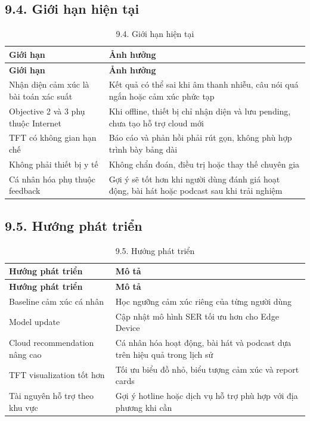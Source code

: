 \documentclass[12pt,a4paper]{article}
\begin{document}
\subsection*{9.4. Giới hạn hiện tại}

\begin{center}
\begin{longtable}{|P{0.30\textwidth}|P{0.62\textwidth}|}
\caption{9.4. Giới hạn hiện tại}\\
\hline
\textbf{Giới hạn} & \textbf{Ảnh hưởng} \\
\hline
\endfirsthead
\hline
\textbf{Giới hạn} & \textbf{Ảnh hưởng} \\
\hline
\endhead
Nhận diện cảm xúc là bài toán xác suất & Kết quả có thể sai khi âm thanh nhiễu, câu nói quá ngắn hoặc cảm xúc phức tạp \\
\hline
Objective 2 và 3 phụ thuộc Internet & Khi offline, thiết bị chỉ nhận diện và lưu pending, chưa tạo hỗ trợ cloud mới \\
\hline
TFT có không gian hạn chế & Báo cáo và phản hồi phải rút gọn, không phù hợp trình bày bảng dài \\
\hline
Không phải thiết bị y tế & Không chẩn đoán, điều trị hoặc thay thế chuyên gia \\
\hline
Cá nhân hóa phụ thuộc feedback & Gợi ý sẽ tốt hơn khi người dùng đánh giá hoạt động, bài hát hoặc podcast sau khi trải nghiệm \\
\hline
\end{longtable}
\end{center}

\subsection*{9.5. Hướng phát triển}

\begin{center}
\begin{longtable}{|P{0.30\textwidth}|P{0.62\textwidth}|}
\caption{9.5. Hướng phát triển}\\
\hline
\textbf{Hướng phát triển} & \textbf{Mô tả} \\
\hline
\endfirsthead
\hline
\textbf{Hướng phát triển} & \textbf{Mô tả} \\
\hline
\endhead
Baseline cảm xúc cá nhân & Học ngưỡng cảm xúc riêng của từng người dùng \\
\hline
Model update & Cập nhật mô hình SER tối ưu hơn cho Edge Device \\
\hline
Cloud recommendation nâng cao & Cá nhân hóa hoạt động, bài hát và podcast dựa trên hiệu quả trong lịch sử \\
\hline
TFT visualization tốt hơn & Tối ưu biểu đồ nhỏ, biểu tượng cảm xúc và report cards \\
\hline
Tài nguyên hỗ trợ theo khu vực & Gợi ý hotline hoặc dịch vụ hỗ trợ phù hợp với địa phương khi cần \\
\hline
\end{longtable}
\end{center}
\end{document}
